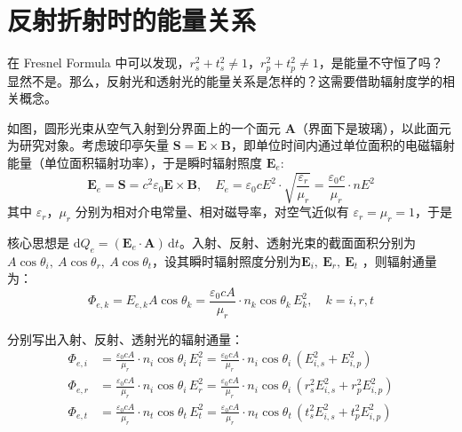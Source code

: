\documentclass[UTF8]{report}
\theoremstyle{MyLineTheoremStyle} %
\theoremstyle{MyBlockTheoremStyle} %
\theoremstyle{MySubsubsectionStyle} %
\begin{document}
\section{反射折射时的能量关系}

在 Fresnel Formula 中可以发现，$r_s^2 + t_s^2 \ne 1$，$r_p^2 + t_p^2 \ne 1$，是能量不守恒了吗？显然不是。那么，反射光和透射光的能量关系是怎样的？这需要借助辐射度学的相关概念。

如图，圆形光束从空气入射到分界面上的一个面元 $\boldsymbol{A}$（界面下是玻璃），以此面元为研究对象。考虑玻印亭矢量 $\boldsymbol{S} = \boldsymbol{E} \times \boldsymbol{B}$，即单位时间内通过单位面积的电磁辐射能量（单位面积辐射功率），于是瞬时辐射照度 $\boldsymbol{E}_e$: 
\begin{equation}
\boldsymbol{E}_e = \boldsymbol{S} = c^2 \varepsilon_0 \boldsymbol{E} \times \boldsymbol{B},\quad  E_e = \varepsilon_0 cE^2 \cdot \sqrt{\frac{\varepsilon_r}{\mu_r}} = \frac{\varepsilon_0 c}{\mu_r}\cdot  nE^2
\end{equation}
其中 $\varepsilon_r$，$\mu_r$ 分别为相对介电常量、相对磁导率，对空气近似有 $\varepsilon_r = \mu_r = 1$，于是

核心思想是 $\mathrm{d} Q_e = (\boldsymbol{E}_e \cdot \boldsymbol{A})\, \mathrm{d}t $。入射、反射、透射光束的截面面积分别为 $A \cos \theta_i,\ A \cos \theta_r,\ A \cos \theta_t$，设其瞬时辐射照度分别为$\boldsymbol{E}_i,\ \boldsymbol{E}_r,\ \boldsymbol{E}_t$ ，则辐射通量为：
\begin{equation}
\Phi_{e, k} = E_{e, k} A \cos \theta_k = \frac{\varepsilon_0 cA }{\mu_r}\cdot  n_k\cos \theta_k\,E_k^2,\quad  k = i, r, t
\end{equation}

分别写出入射、反射、透射光的辐射通量：
\begin{align}
\Phi_{e,i} &= \frac{\varepsilon_0 cA }{\mu_r} \cdot  n_i\cos \theta_i\,E_i^2 
= \frac{\varepsilon_0 cA }{\mu_r} \cdot  n_i\cos \theta_i\, \left( E_{i,s}^2 + E_{i,p}^2 \right) 
\\ 
\Phi_{e,r} 
&= \frac{\varepsilon_0 cA }{\mu_r} \cdot  n_i\cos \theta_i\,E_r^2 
= \frac{\varepsilon_0 cA }{\mu_r} \cdot  n_i\cos \theta_i\, \left( r_s^2E_{i,s}^2 + r_p^2E_{i,p}^2 \right) 
\\ 
\Phi_{e,t} 
&= \frac{\varepsilon_0 cA }{\mu_r} \cdot  n_t\cos \theta_t\,E_t^2 
= \frac{\varepsilon_0 cA }{\mu_r} \cdot  n_t \cos \theta_t \, \left( t_s^2E_{i,s}^2 + t_p^2E_{i,p}^2 \right) 
\end{align}
\end{document}
